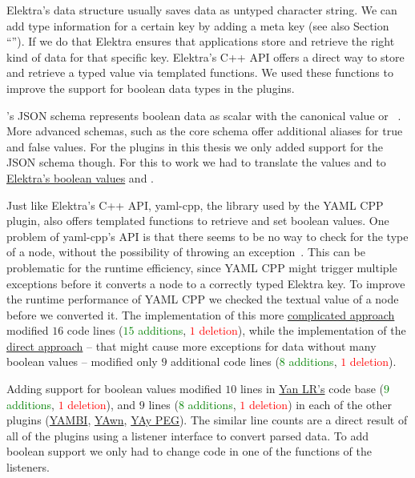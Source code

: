 Elektra’s  data structure usually saves data as untyped character string. We can add type information for a certain key by adding a  meta key (see also Section “”). If we do that Elektra ensures that applications store and retrieve the right kind of data for that specific key. Elektra’s C++ API offers a direct way to store and retrieve a typed value via templated functions. We used these functions to improve the support for boolean data types in the  plugins.

’s JSON schema represents boolean data as scalar with the canonical value  or ~\cite{ben2009yaml}. More advanced schemas, such as the core schema offer additional aliases for true and false values. For the  plugins in this thesis we only added support for the JSON schema though. For this to work we had to translate the  values  and  to \href{https://master.libelektra.org/doc/decisions/bool.md}{Elektra’s boolean values}  and .

Just like Elektra’s C++ API, yaml-cpp, the library used by the YAML CPP plugin, also offers templated functions to retrieve and set boolean values. One problem of yaml-cpp’s API is that there seems to be no way to check for the type of a  node, without the possibility of throwing an exception~\cite{beder2013type}. This can be problematic for the runtime efficiency, since YAML CPP might trigger multiple exceptions before it converts a  node to a correctly typed Elektra key. To improve the runtime performance of YAML CPP we checked the textual value of a  node before we converted it. The implementation of this more \href{https://github.com/ElektraInitiative/libelektra/commit/d4e62eebd006ea4b066c75e6e885ee5a4b6e26cf#diff-4bdb640234f370e3a9db751e1f7d769b}{complicated approach} modified $16$ code lines (\textcolor{Green}{$15$ additions}, \textcolor{Red}{$1$ deletion}), while the implementation of the \href{https://github.com/ElektraInitiative/libelektra/commit/1e9a07baad8a140c6eda654053db450c0901f5d0#diff-4bdb640234f370e3a9db751e1f7d769b}{direct approach} – that might cause more exceptions for data without many boolean values – modified only $9$ additional code lines (\textcolor{Green}{$8$ additions}, \textcolor{Red}{$1$ deletion}).

Adding support for boolean values modified $10$ lines in \href{https://issues.libelektra.org/2653}{Yan LR’s} code base (\textcolor{Green}{$9$ additions}, \textcolor{Red}{$1$ deletion}), and $9$ lines (\textcolor{Green}{$8$ additions}, \textcolor{Red}{$1$ deletion}) in each of the other plugins (\href{https://issues.libelektra.org/2652}{YAMBI}, \href{https://issues.libelektra.org/2651}{YAwn}, \href{https://issues.libelektra.org/2654}{YAy PEG}). The similar line counts are a direct result of all of the plugins using a listener interface to convert parsed  data. To add boolean support we only had to change code in one of the functions of the listeners.

